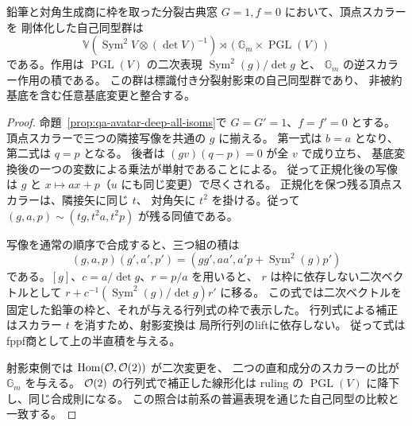 \begin{corollary}[古典閉層の剛体化された自己同型群]
\label{cor:qa-avatar-classical-scroll-group}
鉛筆と対角生成商に枠を取った分裂古典窓 $G=1,f=0$ において、頂点スカラーを
剛体化した自己同型群は
\[
 \mathbb V(\operatorname{Sym}^2V\otimes(\det V)^{-1})
 \rtimes(\mathbb G_m\times\operatorname{PGL}(V))
\]
である。作用は $\operatorname{PGL}(V)$ の二次表現
$\operatorname{Sym}^2(g)/\det g$ と、
$\mathbb G_m$ の逆スカラー作用の積である。
この群は標識付き分裂射影束の自己同型群であり、
非被約基底を含む任意基底変更と整合する。
\end{corollary}
\begin{proof}
命題~\ref{prop:qa-avatar-deep-all-isoms}で
$G=G'=1$、$f=f'=0$ とする。
頂点スカラーで三つの隣接写像を共通の $g$ に揃える。
第一式は $b=a$ となり、第二式は $q=p$ となる。
後者は $(gv)(q-p)=0$ が全 $v$ で成り立ち、
基底変換後の一つの変数による乗法が単射であることによる。
従って正規化後の写像は $g$ と
$x\mapsto a x+p$（$u$ にも同じ変更）で尽くされる。
正規化を保つ残る頂点スカラーは、隣接矢に同じ $t$、
対角矢に $t^2$ を掛ける。従って
$(g,a,p)\sim(tg,t^2a,t^2p)$ が残る同値である。

写像を通常の順序で合成すると、三つ組の積は
\[
 (g,a,p)(g',a',p')
    =(gg',aa',a'p+\operatorname{Sym}^2(g)p')
\]
である。$[g]$、$c=a/\det g$、$r=p/a$ を用いると、
$r$ は枠に依存しない二次ベクトルとして
$r+ c^{-1}(\operatorname{Sym}^2(g)/\det g)r'$ に移る。
この式では二次ベクトルを固定した鉛筆の枠と、それが与える行列式の枠で表示した。
行列式による補正はスカラー $t$ を消すため、射影変換は
局所行列のliftに依存しない。
従って式はfppf商として上の半直積を与える。

射影束側では $\operatorname{Hom}(\mathcal O,\mathcal O(2))$ が二次変更を、
二つの直和成分のスカラーの比が $\mathbb G_m$ を与える。
$\mathcal O(2)$ の行列式で補正した線形化は ruling の
$\operatorname{PGL}(V)$ に降下し、同じ合成則になる。
この照合は前系の普遍表現を通じた自己同型の比較と一致する。
\end{proof}

